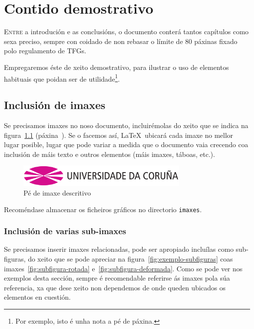 \chapter{Contido demostrativo}
\label{chap:demo}

\lettrine{E}{ntre} a introdución e as conclusións, o documento conterá
tantos capítulos como sexa preciso, sempre con coidado de non rebasar
o límite de 80 páxinas fixado polo regulamento de TFGs.

Empregaremos éste de xeito demostrativo, para ilustrar o uso de elementos
habituais que poidan ser de utilidade\footnote{Por exemplo, isto é unha nota a
  pé de páxina.}.

\section{Inclusión de imaxes}

Se precisamos imaxes no noso documento, incluirémolas do xeito que se indica na
figura~\ref{fig:exemplo} (páxina~\pageref{fig:exemplo}). Se o facemos así,
\LaTeX\ ubicará cada imaxe no mellor lugar posible, lugar que pode variar a
medida que o documento vaia crecendo coa inclusión de máis texto e outros
elementos (máis imaxes, táboas, etc.).

\begin{figure}[hp!]
  \centering
  \includegraphics[width=0.75\textwidth]{imaxes/udc.png}
  \caption{Pé de imaxe descritivo}
  \label{fig:exemplo}
\end{figure}

Recoméndase almacenar os ficheiros gráficos no directorio \texttt{imaxes}.

\subsection{Inclusión de varias sub-imaxes}

Se precisamos inserir imaxes relacionadas, pode ser apropiado incluílas como
sub-figuras, do xeito que se pode apreciar na
figura~\ref{fig:exemplo-subfiguras} coas imaxes~\ref{fig:subfigura-rotada}
e~\ref{fig:subfigura-deformada}. Como se pode ver nos exemplos desta sección,
sempre é recomendable referirse ás imaxes pola súa referencia, xa que dese
xeito non dependemos de onde queden ubicados os elementos en cuestión.

